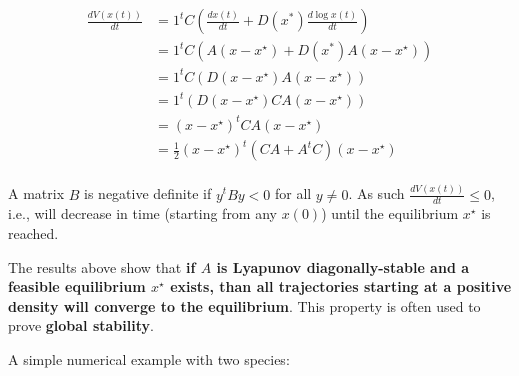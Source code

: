 \documentclass[]{book}
\newenvironment{Shaded}{\begin{snugshade}}{\end{snugshade}}
\newcommand{\CommentTok}[1]{\textcolor[rgb]{0.56,0.35,0.01}{\textit{#1}}}
\newcommand{\DecValTok}[1]{\textcolor[rgb]{0.00,0.00,0.81}{#1}}
\newcommand{\KeywordTok}[1]{\textcolor[rgb]{0.13,0.29,0.53}{\textbf{#1}}}
\newcommand{\NormalTok}[1]{#1}
\newcommand{\OperatorTok}[1]{\textcolor[rgb]{0.81,0.36,0.00}{\textbf{#1}}}
\newcommand{\StringTok}[1]{\textcolor[rgb]{0.31,0.60,0.02}{#1}}
\begin{document}
\[
\begin{aligned}
 \frac{d V(x(t))}{dt} &= 1^t C \left(\frac{d x(t)}{dt}  + D(x^*) \frac{d \log x(t)}{dt} \right)\\
 &= 1^t C \left(A (x - x^\star)  + D(x^*) A (x - x^\star) \right)\\
 &= 1^t C \left(D(x - x^\star)  A (x - x^\star) \right)\\
 &= 1^t \left(D(x - x^\star)  C A (x - x^\star) \right)\\
 &= (x - x^\star)^t  CA (x - x^\star)\\
 &= \frac{1}{2}(x - x^\star)^t  (CA + A^t C) (x - x^\star)\\
\end{aligned}
\]

A matrix \(B\) is negative definite if \(y^t B y < 0\) for all \(y \neq 0\). As such \(\frac{d V(x(t))}{dt} \leq 0\), i.e., will decrease in time (starting from any \(x(0)\)) until the equilibrium \(x^\star\) is reached.

The results above show that \textbf{if \(A\) is Lyapunov diagonally-stable and a feasible equilibrium \(x^\star\) exists, than all trajectories starting at a positive density will converge to the equilibrium}. This property is often used to prove \textbf{global stability}.

A simple numerical example with two species:

\begin{Shaded}
\end{Shaded}
\end{document}

